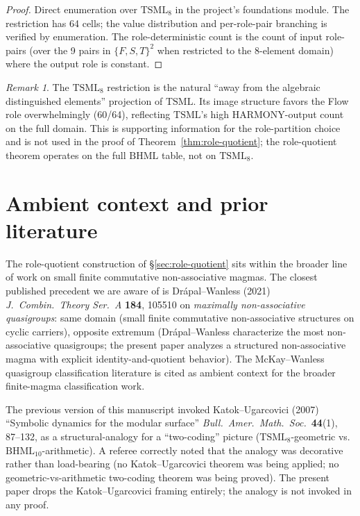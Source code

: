\documentclass[11pt,reqno]{amsart}
\theoremstyle{plain}
\theoremstyle{definition}
\theoremstyle{remark}
\newtheorem*{remark}{Remark}
\newcommand{\TS}{\mathrm{TSML}}
\newcommand{\BH}{\mathrm{BHML}}
\begin{document}
\begin{proof}
Direct enumeration over $\TS_8$ in the project's foundations module.
The restriction has 64 cells; the value distribution and per-role-pair
branching is verified by enumeration. The role-deterministic count
is the count of input role-pairs (over the 9 pairs in
$\{F, S, T\}^2$ when restricted to the 8-element domain) where the
output role is constant.
\end{proof}

\begin{remark}
The $\TS_8$ restriction is the natural ``away from the algebraic
distinguished elements'' projection of $\TS$. Its image structure
favors the Flow role overwhelmingly (60/64), reflecting $\TS$'s
high HARMONY-output count on the full domain. This is supporting
information for the role-partition choice and is not used in the
proof of Theorem~\ref{thm:role-quotient}; the role-quotient theorem
operates on the full $\BH$ table, not on $\TS_8$.
\end{remark}

\section{Ambient context and prior literature} \label{sec:ambient}

The role-quotient construction of \S\ref{sec:role-quotient} sits
within the broader line of work on small finite commutative
non-associative magmas. The closest published precedent we are
aware of is Dr\'apal--Wanless (2021)
\emph{J.\ Combin.\ Theory Ser.\ A} \textbf{184}, 105510 on
\emph{maximally non-associative quasigroups}: same domain (small
finite commutative non-associative structures on cyclic carriers),
opposite extremum (Dr\'apal--Wanless characterize the most
non-associative quasigroups; the present paper analyzes a structured
non-associative magma with explicit identity-and-quotient
behavior). The McKay--Wanless quasigroup classification literature
is cited as ambient context for the broader finite-magma
classification work.

The previous version of this manuscript invoked
Katok--Ugarcovici (2007) ``Symbolic dynamics for the modular
surface'' \emph{Bull.\ Amer.\ Math.\ Soc.}\ \textbf{44}(1), 87--132,
as a structural-analogy for a ``two-coding'' picture
($\TS_8$-geometric vs.\ $\BH_{10}$-arithmetic). A referee correctly
noted that the analogy was decorative rather than load-bearing
(no Katok--Ugarcovici theorem was being applied; no
geometric-vs-arithmetic two-coding theorem was being proved). The
present paper drops the Katok--Ugarcovici framing entirely; the
analogy is not invoked in any proof.
\end{document}
